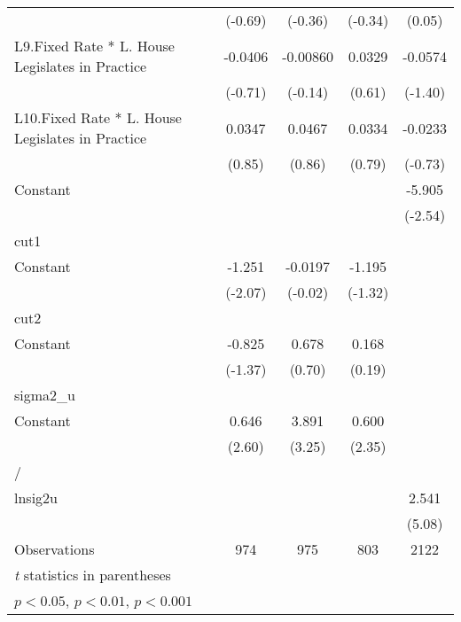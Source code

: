 {\begin{longtable}{l*{4}{c}}
                &  (-0.69)         &  (-0.36)         &  (-0.34)         &   (0.05)         \\
[1em]
L9.Fixed Rate * L. House Legislates in Practice&  -0.0406         & -0.00860         &   0.0329         &  -0.0574         \\
                &  (-0.71)         &  (-0.14)         &   (0.61)         &  (-1.40)         \\
[1em]
L10.Fixed Rate * L. House Legislates in Practice&   0.0347         &   0.0467         &   0.0334         &  -0.0233         \\
                &   (0.85)         &   (0.86)         &   (0.79)         &  (-0.73)         \\
[1em]
Constant        &                  &                  &                  &   -5.905\sym{*}  \\
                &                  &                  &                  &  (-2.54)         \\
\hline
cut1            &                  &                  &                  &                  \\
Constant        &   -1.251\sym{*}  &  -0.0197         &   -1.195         &                  \\
                &  (-2.07)         &  (-0.02)         &  (-1.32)         &                  \\
\hline
cut2            &                  &                  &                  &                  \\
Constant        &   -0.825         &    0.678         &    0.168         &                  \\
                &  (-1.37)         &   (0.70)         &   (0.19)         &                  \\
\hline
sigma2\_u        &                  &                  &                  &                  \\
Constant        &    0.646\sym{**} &    3.891\sym{**} &    0.600\sym{*}  &                  \\
                &   (2.60)         &   (3.25)         &   (2.35)         &                  \\
\hline
/               &                  &                  &                  &                  \\
lnsig2u         &                  &                  &                  &    2.541\sym{***}\\
                &                  &                  &                  &   (5.08)         \\
\hline
Observations    &      974         &      975         &      803         &     2122         \\
\hline\hline
\multicolumn{5}{l}{\footnotesize \textit{t} statistics in parentheses}\\
\multicolumn{5}{l}{\footnotesize \sym{*} \(p<0.05\), \sym{**} \(p<0.01\), \sym{***} \(p<0.001\)}\\
\end{longtable}
}
